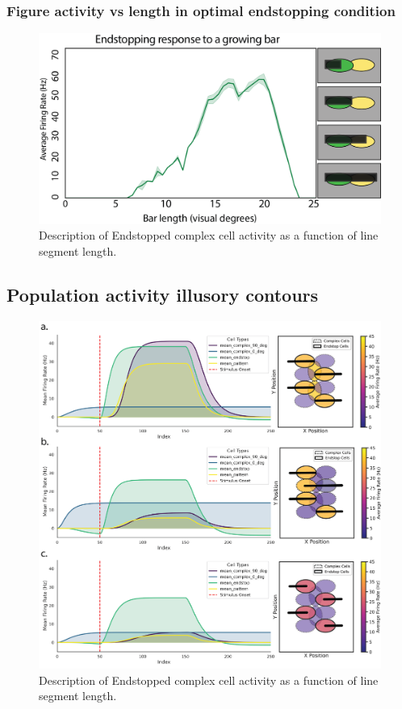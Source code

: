\documentclass[12pt]{article}
\begin{document}
  \subsubsection{Figure activity vs length in optimal endstopping condition}
  \begin{figure}[H]
    \centering
    \includegraphics[width=1.0 \textwidth]{figures/endstop_line_length.png}
    \caption{Description of Endstopped complex cell activity as a function of line segment length.}
    \label{fig:endstopping_length}
  \end{figure}

\subsection{Population activity illusory contours}
\begin{figure}[H]
  \centering
  \includegraphics[width=1.0 \textwidth]{figures/Figure_Population_configs.png}
  \caption{Description of Endstopped complex cell activity as a function of line segment length.}
  \label{fig:population_contours}
\end{figure}
\end{document}
